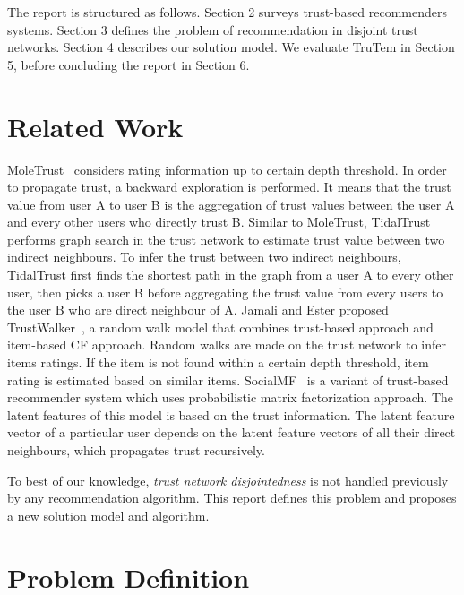 \documentclass[11pt, conference, onecolumn]{IEEEtran}
\begin{document}
The report is structured as follows. Section 2 surveys trust-based recommenders systems. Section 3 defines the problem of recommendation in disjoint trust networks. Section 4 describes our solution model. We evaluate TruTem in Section 5, before concluding the report in Section 6.


\section{Related Work} \label{sec:related}
MoleTrust~\cite{Massa:2007} considers rating information up to certain depth threshold. In order to propagate trust, a backward exploration is performed. It means that the trust value from user A to user B is the aggregation of trust values between the user A and every other users who directly trust B. Similar to MoleTrust, TidalTrust~\cite{Golbeck:2005} performs graph search in the trust network to estimate trust value between two indirect neighbours. To infer the trust between two indirect neighbours, TidalTrust first finds the shortest path in the graph from a user A to every other user, then picks a user B before aggregating the trust value from every users to the user B who are direct neighbour of A. Jamali and Ester proposed TrustWalker~\cite{Jamali:2009}, a random walk model that combines trust-based approach and item-based CF approach. Random walks are made on the trust network to infer items ratings. If the item is not found within a certain depth threshold, item rating is estimated based on similar items. SocialMF~\cite{Jamali:2010} is a variant of trust-based recommender system which uses probabilistic matrix factorization approach. The latent features of this model is based on the trust information. The latent feature vector of a particular user depends on the latent feature vectors of all their direct neighbours, which propagates trust recursively.

To best of our knowledge, \textit{trust network disjointedness} is not handled previously by any recommendation algorithm. This report defines this problem and proposes a new solution model and algorithm.

\section{Problem Definition} \label{sec:problem}

\end{document}

